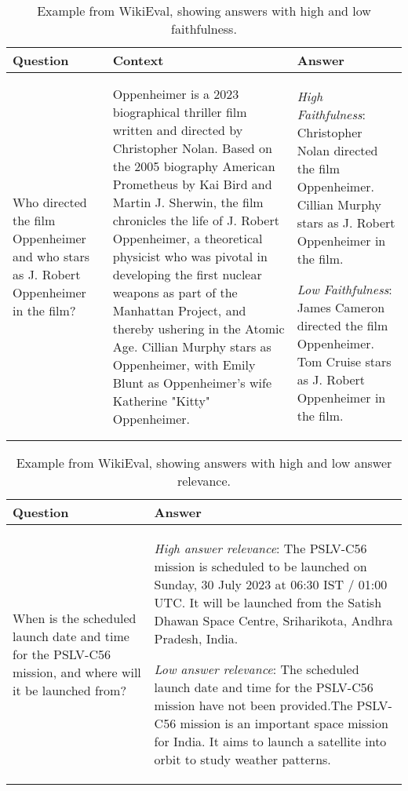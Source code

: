 \documentclass[11pt]{article}
\begin{document}
\begin{table*}
\footnotesize
\centering
\begin{tabular}{p{90pt}p{200pt}p{120pt}}
\toprule
\textbf{Question} & \textbf{Context} & \textbf{Answer} \\
\midrule
Who directed the film Oppenheimer and who stars as J. Robert Oppenheimer in the film? &
Oppenheimer is a 2023 biographical thriller film written and directed by Christopher Nolan. Based on the 2005 biography American Prometheus by Kai Bird and Martin J. Sherwin, the film chronicles the life of J. Robert Oppenheimer, a theoretical physicist who was pivotal in developing the first nuclear weapons as part of the Manhattan Project, and thereby ushering in the Atomic Age. Cillian Murphy stars as Oppenheimer, with Emily Blunt as Oppenheimer's wife Katherine "Kitty" Oppenheimer.&
\textit{High Faithfulness}:
Christopher Nolan directed the film Oppenheimer. Cillian Murphy stars as J. Robert Oppenheimer in the film.

\smallskip
\textit{Low Faithfulness}:
James Cameron directed the film Oppenheimer. Tom Cruise stars as J. Robert Oppenheimer in the film.\\
\bottomrule
\end{tabular}
\caption{Example from WikiEval, showing answers with high and low faithfulness. \label{tabExamplesWikiEvalFaithfulness}}
\end{table*}


\begin{table*}
\footnotesize
\centering
\begin{tabular}{p{90pt}p{330pt}}
\toprule
\textbf{Question} & \textbf{Answer} \\
\midrule
When is the scheduled launch date and time for the PSLV-C56 mission, and where will it be launched from?
& \textit{High answer relevance}: The PSLV-C56 mission is scheduled to be launched on Sunday, 30 July 2023 at 06:30 IST / 01:00 UTC. It will be launched from the Satish Dhawan Space Centre, Sriharikota, Andhra Pradesh, India.

\smallskip
\textit{Low answer relevance}: The scheduled launch date and time for the PSLV-C56 mission have not been provided.The PSLV-C56 mission is an important space mission for India. It aims to launch a satellite into orbit to study weather patterns.\\
\bottomrule
\end{tabular}
\caption{Example from WikiEval, showing answers with high and low answer relevance. \label{tabExamplesWikiEvalAnswerRelevance}}
\end{table*}
\end{document}
